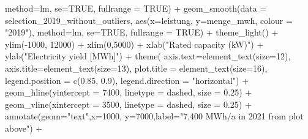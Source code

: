\documentclass[a4paper,11pt]{article}
\newenvironment{Shaded}{\begin{snugshade}}{\end{snugshade}}
\newcommand{\AttributeTok}[1]{\textcolor[rgb]{0.77,0.63,0.00}{#1}}
\newcommand{\ConstantTok}[1]{\textcolor[rgb]{0.00,0.00,0.00}{#1}}
\newcommand{\DecValTok}[1]{\textcolor[rgb]{0.00,0.00,0.81}{#1}}
\newcommand{\FloatTok}[1]{\textcolor[rgb]{0.00,0.00,0.81}{#1}}
\newcommand{\FunctionTok}[1]{\textcolor[rgb]{0.00,0.00,0.00}{#1}}
\newcommand{\NormalTok}[1]{#1}
\newcommand{\SpecialCharTok}[1]{\textcolor[rgb]{0.00,0.00,0.00}{#1}}
\newcommand{\StringTok}[1]{\textcolor[rgb]{0.31,0.60,0.02}{#1}}
\begin{document}
\begin{Shaded}
\begin{Highlighting}[]
              \AttributeTok{method=}\NormalTok{lm, }\AttributeTok{se=}\ConstantTok{TRUE}\NormalTok{, }\AttributeTok{fullrange =} \ConstantTok{TRUE}\NormalTok{)  }\SpecialCharTok{+}
  \FunctionTok{geom\_smooth}\NormalTok{(}\AttributeTok{data =}\NormalTok{ selection\_2019\_without\_outliers, }
              \FunctionTok{aes}\NormalTok{(}\AttributeTok{x=}\NormalTok{leistung, }\AttributeTok{y=}\NormalTok{menge\_mwh, }\AttributeTok{colour =} \StringTok{"2019"}\NormalTok{),}
              \AttributeTok{method=}\NormalTok{lm, }\AttributeTok{se=}\ConstantTok{TRUE}\NormalTok{, }\AttributeTok{fullrange =} \ConstantTok{TRUE}\NormalTok{)  }\SpecialCharTok{+}
  \FunctionTok{theme\_light}\NormalTok{() }\SpecialCharTok{+}
  \FunctionTok{ylim}\NormalTok{(}\SpecialCharTok{{-}}\DecValTok{1000}\NormalTok{, }\DecValTok{12000}\NormalTok{) }\SpecialCharTok{+}
  \FunctionTok{xlim}\NormalTok{(}\DecValTok{0}\NormalTok{,}\DecValTok{5000}\NormalTok{) }\SpecialCharTok{+}
  \FunctionTok{xlab}\NormalTok{(}\StringTok{"Rated capacity (kW)"}\NormalTok{) }\SpecialCharTok{+}
  \FunctionTok{ylab}\NormalTok{(}\StringTok{"Electricity yield [MWh]"}\NormalTok{) }\SpecialCharTok{+}
  \FunctionTok{theme}\NormalTok{( }\AttributeTok{axis.text=}\FunctionTok{element\_text}\NormalTok{(}\AttributeTok{size=}\DecValTok{12}\NormalTok{),}
         \AttributeTok{axis.title=}\FunctionTok{element\_text}\NormalTok{(}\AttributeTok{size=}\DecValTok{13}\NormalTok{),}
         \AttributeTok{plot.title =} \FunctionTok{element\_text}\NormalTok{(}\AttributeTok{size=}\DecValTok{16}\NormalTok{),}
         \AttributeTok{legend.position =} \FunctionTok{c}\NormalTok{(}\FloatTok{0.85}\NormalTok{, }\FloatTok{0.9}\NormalTok{),}
         \AttributeTok{legend.direction =} \StringTok{"horizontal"}\NormalTok{) }\SpecialCharTok{+}
  \FunctionTok{geom\_hline}\NormalTok{(}\AttributeTok{yintercept =} \DecValTok{7400}\NormalTok{, }\AttributeTok{linetype =} \StringTok{\textquotesingle{}dashed\textquotesingle{}}\NormalTok{, }\AttributeTok{size =} \FloatTok{0.25}\NormalTok{) }\SpecialCharTok{+}
  \FunctionTok{geom\_vline}\NormalTok{(}\AttributeTok{xintercept =} \DecValTok{3500}\NormalTok{, }\AttributeTok{linetype =} \StringTok{\textquotesingle{}dashed\textquotesingle{}}\NormalTok{, }\AttributeTok{size =} \FloatTok{0.25}\NormalTok{) }\SpecialCharTok{+}
  \FunctionTok{annotate}\NormalTok{(}\AttributeTok{geom=}\StringTok{"text"}\NormalTok{,}\AttributeTok{x=}\DecValTok{1000}\NormalTok{,}
           \AttributeTok{y=}\DecValTok{7000}\NormalTok{,}\AttributeTok{label=}\StringTok{"7,400 MWh/a in 2021 from plot above"}\NormalTok{) }\SpecialCharTok{+}

\end{Highlighting}
\end{Shaded}
\end{document}
